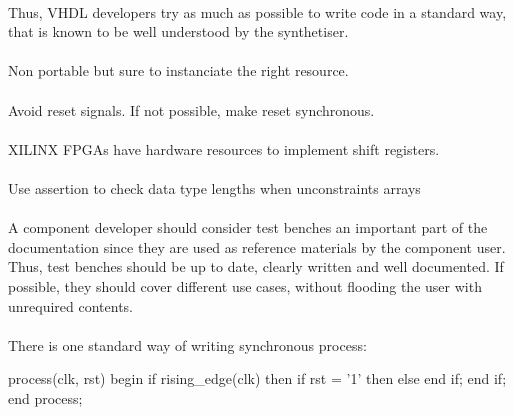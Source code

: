 \documentclass[12pt]{article}
\begin{document}
\paragraph{}
Thus, VHDL developers try as much as possible to write code
in a standard way, that is known to be well understood by the
synthetiser.


\paragraph{}
Non portable but sure to instanciate the right resource.


\paragraph{}
Avoid reset signals. If not possible, make reset synchronous.


\paragraph{}
XILINX FPGAs have hardware resources to implement shift registers.



\paragraph{}
Use assertion to check data type lengths when unconstraints
arrays



\paragraph{}
A component developer should consider test benches an important
part of the documentation since they are used as reference
materials by the component user. Thus, test benches should be up
to date, clearly written and well documented. If possible, they
should cover different use cases, without flooding the user with
unrequired contents.



\paragraph{}
There is one standard way of writing synchronous process:
\begin{vhdl}
process(clk, rst)
begin
 if rising_edge(clk) then
  if rst = '1' then
  else
  end if;
 end if;
end process;
\end{vhdl}
\end{document}
